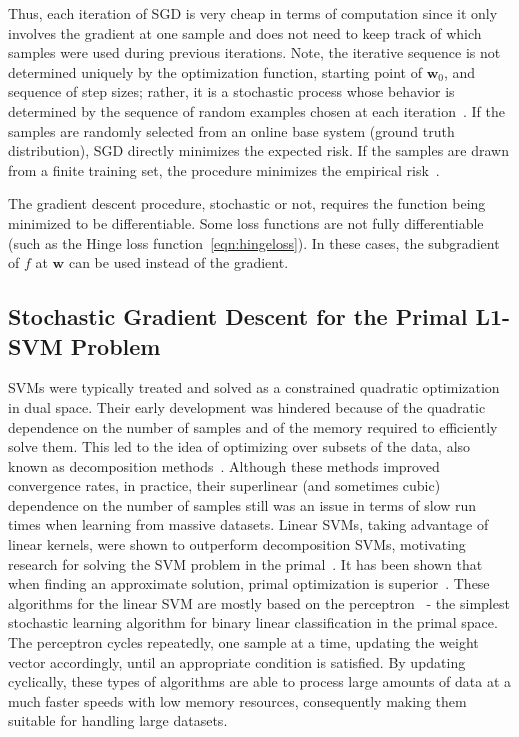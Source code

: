 \documentclass[reqno]{vcuthesis}
\numberwithin{equation}{chapter}
\begin{document}
Thus, each iteration of SGD is very cheap in terms of computation since it only involves the gradient at one sample and does not need to keep track of which samples were used during previous iterations. Note, the iterative sequence is not determined uniquely by the optimization function, starting point of $\bm w_0$, and sequence of step sizes; rather, it is a stochastic process whose behavior is determined by the sequence of random examples chosen at each iteration~\cite{bottou2010large,bottou2018optimization}. If the samples are randomly selected from an online base system (ground truth distribution), SGD directly minimizes the expected risk. If the samples are drawn from a finite training set, the procedure minimizes the empirical risk~\cite{bottou2002stochastic}.

The gradient descent procedure, stochastic or not, requires the function being minimized to be differentiable. Some loss functions are not fully differentiable (such as the Hinge loss function~\ref{eqn:hingeloss}). In these cases, the subgradient of $f$ at $\bm{w}$ can be used instead of the gradient. 

\subsection{Stochastic Gradient Descent for the Primal L1-SVM Problem}
SVMs were typically treated and solved as a constrained quadratic optimization in dual space. Their early development was hindered because of the quadratic dependence on the number of samples and of the memory required to efficiently solve them. This led to the idea of optimizing over subsets of the data, also known as decomposition methods~\cite{boser1992training,Joachims1999,keerthi2001improvements,Platt1998}. Although these methods improved convergence rates, in practice, their superlinear (and sometimes cubic) dependence on the number of samples still was an issue in terms of slow run times when learning from massive datasets. Linear SVMs, taking advantage of linear kernels, were shown to outperform decomposition SVMs, motivating research for solving the SVM problem in the primal~\cite{Chapelle2007,panagiotakopoulos2013stochastic}. It has been shown that when finding an approximate solution, primal optimization is superior~\cite{Chapelle2007}. These algorithms for the linear SVM are mostly based on the perceptron~\cite{freund1999large,rosenblatt1958perceptron} - the simplest stochastic learning algorithm for binary linear classification in the primal space. The perceptron cycles repeatedly, one sample at a time, updating the weight vector accordingly, until an appropriate condition is satisfied. By updating cyclically, these types of algorithms are able to process large amounts of data at a much faster speeds with low memory resources, consequently making them suitable for handling large datasets. 
\end{document}

